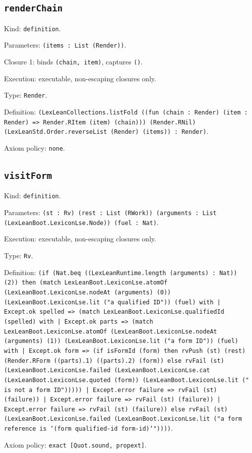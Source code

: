 \documentclass[11pt]{article}
\begin{document}
\subsection*{\texttt{renderChain}}
\noindent Kind: \texttt{definition}.\par
\noindent Parameters: \texttt{(items : List (Render))}.\par
\noindent Closure 1: binds \texttt{(chain, item)}, captures \texttt{()}.\par
\noindent Execution: executable, non-escaping closures only.\par
\noindent Type: \texttt{Render}.\par
\noindent Definition: \texttt{(LexLeanCollections.listFold ((fun (chain : Render) (item : Render) => Render.RItem (item) (chain))) (Render.RNil) (LexLeanStd.Order.reverseList (Render) (items)) : Render)}.\par
\noindent Axiom policy: \texttt{none}.\par
\subsection*{\texttt{visitForm}}
\noindent Kind: \texttt{definition}.\par
\noindent Parameters: \texttt{(st : Rv) (rest : List (RWork)) (arguments : List (LexLeanBoot.LexiconLse.Node)) (fuel : Nat)}.\par
\noindent Execution: executable, non-escaping closures only.\par
\noindent Type: \texttt{Rv}.\par
\noindent Definition: \texttt{(if (Nat.beq ((LexLeanRuntime.length (arguments) : Nat)) (2)) then (match LexLeanBoot.LexiconLse.atomOf (LexLeanBoot.LexiconLse.nodeAt (arguments) (0)) (LexLeanBoot.LexiconLse.lit ("a qualified ID")) (fuel) with | Except.ok spelled => (match LexLeanBoot.LexiconLse.qualifiedId (spelled) with | Except.ok parts => (match LexLeanBoot.LexiconLse.atomOf (LexLeanBoot.LexiconLse.nodeAt (arguments) (1)) (LexLeanBoot.LexiconLse.lit ("a form ID")) (fuel) with | Except.ok form => (if isFormId (form) then rvPush (st) (rest) (Render.RForm ((parts).1) ((parts).2) (form)) else rvFail (st) (LexLeanBoot.LexiconLse.failed (LexLeanBoot.LexiconLse.cat (LexLeanBoot.LexiconLse.quoted (form)) (LexLeanBoot.LexiconLse.lit (" is not a form ID"))))) | Except.error failure => rvFail (st) (failure)) | Except.error failure => rvFail (st) (failure)) | Except.error failure => rvFail (st) (failure)) else rvFail (st) (LexLeanBoot.LexiconLse.failed (LexLeanBoot.LexiconLse.lit ("a form reference is `(form qualified-id form-id)`"))))}.\par
\noindent Axiom policy: \texttt{exact [Quot.sound, propext]}.\par
\end{document}
